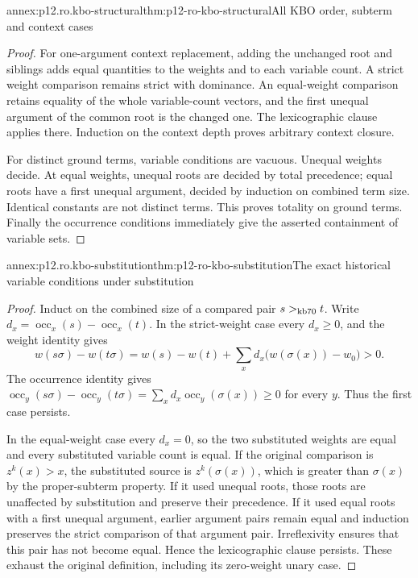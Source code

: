 \begin{annexitem}{annex:p12.ro.kbo-structural}{thm:p12-ro-kbo-structural}{All KBO order, subterm and context cases}
\begin{proof}
For one-argument context replacement, adding the unchanged root and
siblings adds equal quantities to the weights and to each variable
count. A strict weight comparison remains strict with dominance.
An equal-weight comparison retains equality of the whole variable-count
vectors, and the first unequal argument of the common root is the
changed one. The lexicographic clause applies there. Induction on
the context depth proves arbitrary context closure.

For distinct ground terms, variable conditions are vacuous. Unequal
weights decide. At equal weights, unequal roots are decided by total
precedence; equal roots have a first unequal argument, decided by
induction on combined term size. Identical constants are not distinct
terms. This proves totality on ground terms. Finally the occurrence
conditions immediately give the asserted containment of variable sets.
\end{proof}
\end{annexitem}

\begin{annexitem}{annex:p12.ro.kbo-substitution}{thm:p12-ro-kbo-substitution}{The exact historical variable conditions under substitution}
\begin{proof}
Induct on the combined size of a compared pair \(s>_{\rm kb70}t\).
Write \(d_x=\operatorname{occ}_x(s)-\operatorname{occ}_x(t)\).
In the strict-weight case every \(d_x\geq0\), and the weight
identity gives
\[
 w(s\sigma)-w(t\sigma)=w(s)-w(t)
       +\sum_x d_x\bigl(w(\sigma(x))-w_0\bigr)>0.
\]
The occurrence identity gives
\(\operatorname{occ}_y(s\sigma)-\operatorname{occ}_y(t\sigma)
=\sum_x d_x\operatorname{occ}_y(\sigma(x))\geq0\)
for every \(y\). Thus the first case persists.

In the equal-weight case every \(d_x=0\), so the two substituted
weights are equal and every substituted variable count is equal.
If the original comparison is \(z^k(x)>x\), the substituted source
is \(z^k(\sigma(x))\), which is greater than \(\sigma(x)\)
by the proper-subterm property. If it used unequal roots, those roots
are unaffected by substitution and preserve their precedence.
If it used equal roots with a first unequal argument, earlier argument
pairs remain equal and induction preserves the strict comparison of
that argument pair. Irreflexivity ensures that this pair has not become
equal. Hence the lexicographic clause persists. These exhaust the
original definition, including its zero-weight unary case.
\end{proof}
\end{annexitem}

